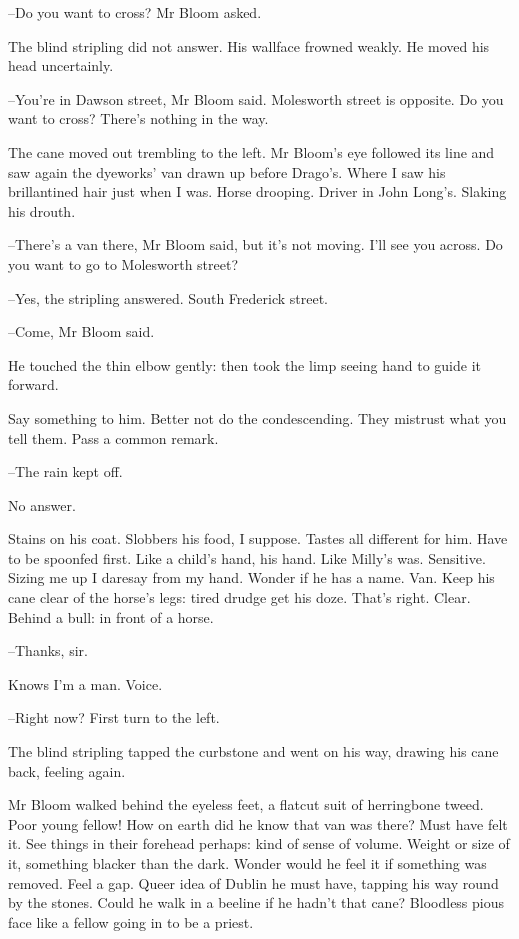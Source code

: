 --Do you want to cross?
Mr Bloom asked.

The blind stripling did not answer.
His wallface frowned weakly.
He moved his head uncertainly.

--You're in Dawson street,
Mr Bloom said.
Molesworth street is opposite.
Do you want to cross?
There's nothing in the way.

The cane moved out trembling to the left.
Mr Bloom's eye followed its line and saw again the dyeworks' van drawn up before Drago's.
Where I saw his brillantined hair just when I was.
Horse drooping.
Driver in John Long's.
Slaking his drouth.

--There's a van there,
Mr Bloom said,
but it's not moving.
I'll see you across.
Do you want to go to Molesworth street?

--Yes,
the stripling answered.
South Frederick street.

--Come,
Mr Bloom said.

He touched the thin elbow gently:
then took the limp seeing hand to guide it forward.

Say something to him.
Better not do the condescending.
They mistrust what you tell them.
Pass a common remark.

--The rain kept off.

No answer.

Stains on his coat.
Slobbers his food, I suppose.
Tastes all different for him.
Have to be spoonfed first.
Like a child's hand, his hand.
Like Milly's was.
Sensitive.
Sizing me up I daresay from my hand.
Wonder if he has a name.
Van.
Keep his cane clear of the horse's legs:
tired drudge get his doze.
That's right.
Clear.
Behind a bull:
in front of a horse.

--Thanks, sir.

Knows I'm a man.
Voice.

--Right now?
First turn to the left.

The blind stripling tapped the curbstone and went on his way,
drawing his cane back,
feeling again.

Mr Bloom walked behind the eyeless feet,
a flatcut suit of herringbone tweed.
Poor young fellow!
How on earth did he know that van was there?
Must have felt it.
See things in their forehead perhaps:
kind of sense of volume.
Weight or size of it,
something blacker than the dark.
Wonder would he feel it if something was removed.
Feel a gap.
Queer idea of Dublin he must have,
tapping his way round by the stones.
Could he walk in a beeline if he hadn't that cane?
Bloodless pious face like a fellow going in to be a priest.

